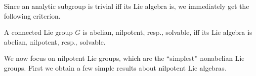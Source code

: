 
    

Since an analytic subgroup is trivial iff its Lie algebra is, we immediately get the following criterion.

\begin{thm}[{\cite[Thm.~11.2.5]{HN}}]\label{thm 11.2.5 HN}
    A connected Lie group $G$ is abelian, nilpotent, resp., solvable, iff its Lie algebra is abelian, nilpotent, resp., solvable.
\end{thm}

We now focus on nilpotent Lie groups, which are the ``simplest'' nonabelian Lie groups. First we obtain a few simple results about nilpotent Lie algebras.

